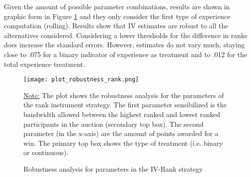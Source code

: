 Given the amount of possible parameter combinations, results are shown in graphic form in Figure \ref{fig:plot_robustness_rank} and they only consider the first type of experience computation (rolling). Results show that IV estimates are robust to all the alternatives considered. Considering a lower thresholds for the difference in ranks does increase the standard errors. However, estimates do not vary much, staying close to .075 for a binary indicator of experience as treatment and to .012 for the total experience treatment.

\begin{figure}[h]
  \texttt{[image: plot\_robustness\_rank.png]}
  \caption{Robustness analysis for parameters in the IV-Rank strategy}
  \label{fig:plot_robustness_rank}
  \vskip 0.5mm
  {\noindent \justifying\footnotesize\underline {Note:} The plot shows the robustness analysis for the parameters of the rank instrument strategy. The first parameter sensibilized is the bandwidth allowed between the highest ranked and lowest ranked participants in the auction (secondary top box). The second parameter (in the x-axis) are the amount of points awarded for a win. The primary top box shows the type of treatment (i.e. binary or continuous).\par}
\end{figure}
